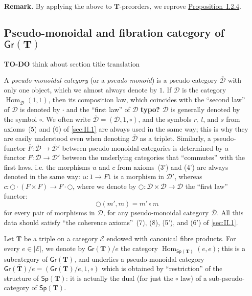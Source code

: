 \documentclass[fleqn]{article}
\newenvironment{rmenv}[1]
  {\phantomsection\par\medskip\noindent\textbf{#1.}\rmfamily}
  {\par\medskip}
\newcommand{\oldpage}[1]{\marginpar{\footnotesize$\Big\vert$ \textit{p.~#1}}}
\newcommand{\todo}{{\color{purple}\textbf{TO-DO }}}
\newcommand{\unsure}[1]{{\color{purple}\textbf{#1}}}
\newcommand{\TT}{\mathbf{T}}
\newcommand{\cat}[1]{\mathcal{#1}}
\newcommand{\Cat}[1]{\mathsf{#1}}
\newcommand{\set}[1]{|#1|}
\newcommand{\Gr}[1]{\Cat{Gr}(#1)}
\newcommand{\Sp}[1]{\Cat{Sp}(#1)}
\DeclareMathOperator{\Hom}{Hom}
\begin{document}
\oldpage{262}

\begin{rmenv}{Remark}
  By applying the above to $\TT$-preorders, we reprove \hyperref[proposition:I.2.4]{Proposition~I.2.4}.
\end{rmenv}



\subsection{Pseudo-monoidal and fibration category of $\Gr{\TT}$}
\label{sec:II.4}

\todo{think about section title translation}

A \emph{pseudo-monoidal category} (or a \emph{pseudo-monoid}) is a pseudo-category $\overline{\cat{D}}$ with only one object, which we almost always denote by $1$.
If $\cat{D}$ is the category $\Hom_{\overline{\cat{D}}}(1,1)$, then its composition law, which coincides with the ``second law'' of $\overline{\cat{D}}$ is denoted by $\cdot$ and the ``first law'' of $\cat{D}$ \unsure{typo? $\overline{\cat{D}}$} is generally denoted by the symbol $\circ$.
We often write $\overline{\cat{D}}=(\cat{D},1,\circ)$, and the symbols $r$, $l$, and $s$ from axioms~(5) and (6) of \cref{sec:II.1} are always used in the same way;
this is why they are easily understood even when denoting $\overline{\cat{D}}$ as a triplet.
Similarly, a pseudo-functor $\overline{F}\colon\overline{\cat{D}}\to\overline{\cat{D}}'$ between pseudo-monoidal categories is determined by a functor $F\colon\cat{D}\to\cat{D}'$ between the underlying categories that ``commutes'' with the first laws, i.e. the morphisms $u$ and $c$ from axioms~(3') and (4') are always denoted in the same way: $u\colon1\to F1$ is a morphism in $\cat{D}'$, whereas $c\colon\bigcirc\cdot(F\times F)\to F\cdot\bigcirc$, where we denote by $\bigcirc\colon\cat{D}\times\cat{D}\to\cat{D}$ the ``first law'' functor:
\[
  \bigcirc(m',m)
  = m'\circ m
\]
for every pair of morphisms in $\cat{D}$, for any pseudo-monoidal category $\overline{\cat{D}}$.
All this data should satisfy ``the coherence axioms''~(7), (8), (5'), and (6') of \cref{sec:II.1}.

Let $\TT$ be a triple on a category $\cat{E}$ endowed with canonical fibre products.
For every $e\in\set{\cat{E}}$, we denote by $\Gr{\TT}/e$ the category $\Hom_{\Sp{\TT}}(e,e)$;
this is a subcategory of $\Gr{\TT}$, and underlies a pseudo-monoidal category $\overline{\Gr{\TT}/e}=(\Gr{\TT}/e,1,\circ)$ which is obtained by ``restriction'' of the structure of $\Sp{\TT}$: it is actually the dual (for just the $\circ$ law) of a sub-pseudo-category of $\Sp{\TT}$.
\end{document}
